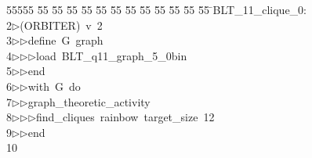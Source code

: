 %
%
\begin{tabbing}
55555 \= 55 \= 55 \= 55 \= 55 \= 55 \= 55 \= 55 \= 55 \= 55 \= 55 \= 55 \= 55 \= \>BLT\_11\_clique\_0:\\[0pt]
2\>$\triangleright$\>(ORBITER)\ v\ 2\ \\[0pt]
3\>$\triangleright$\>$\triangleright$\>define\ G\ graph\ \\[0pt]
4\>$\triangleright$\>$\triangleright$\>$\triangleright$\>load\ BLT\_q11\_graph\_5\_0bin\ \\[0pt]
5\>$\triangleright$\>$\triangleright$\>end\ \\[0pt]
6\>$\triangleright$\>$\triangleright$\>with\ G\ do\ \\[0pt]
7\>$\triangleright$\>$\triangleright$\>graph\_theoretic\_activity\ \\[0pt]
8\>$\triangleright$\>$\triangleright$\>$\triangleright$\>find\_cliques\ rainbow\ target\_size\ 12\ \\[0pt]
9\>$\triangleright$\>$\triangleright$\>end\\[0pt]
10\>\end{tabbing}

